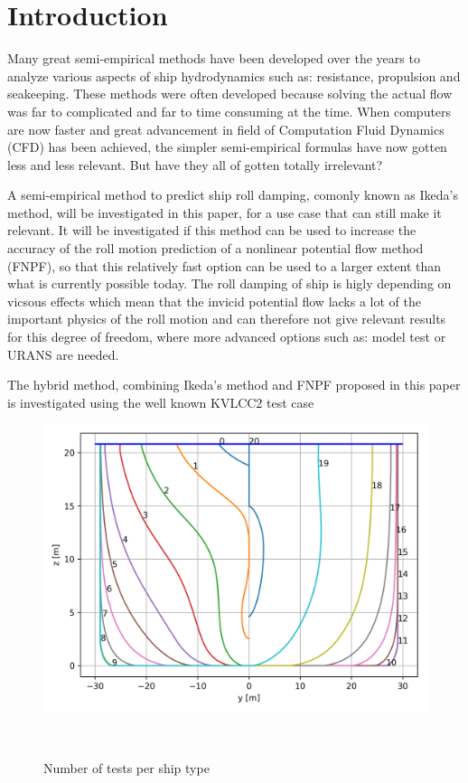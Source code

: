 \section{Introduction}\label{introduction}

Many great semi-empirical methods have been developed over the years to
analyze various aspects of ship hydrodynamics such as: resistance,
propulsion and seakeeping. These methods were often developed because
solving the actual flow was far to complicated and far to time consuming
at the time. When computers are now faster and great advancement in
field of Computation Fluid Dynamics (CFD) has been achieved, the simpler
semi-empirical formulas have now gotten less and less relevant. But have
they all of gotten totally irrelevant?

A semi-empirical method to predict ship roll damping, comonly known as
Ikeda's method, will be investigated in this paper, for a use case that
can still make it relevant. It will be investigated if this method can
be used to increase the accuracy of the roll motion prediction of a
nonlinear potential flow method (FNPF), so that this relatively fast
option can be used to a larger extent than what is currently possible
today. The roll damping of ship is higly depending on vicsous effects
which mean that the invicid potential flow lacks a lot of the important
physics of the roll motion and can therefore not give relevant results
for this degree of freedom, where more advanced options such as: model
test or URANS are needed.

The hybrid method, combining Ikeda's method and FNPF proposed in this
paper is investigated using the well known KVLCC2 test case


\begin{figure}[H]
    \centering
    \includegraphics[width=0.9\linewidth]{figures/body_plan.png}
    \caption{Number of tests per ship type}
    \label{fig:ship_types}
    { \hspace*{\fill} \\}
\end{figure}    
 

